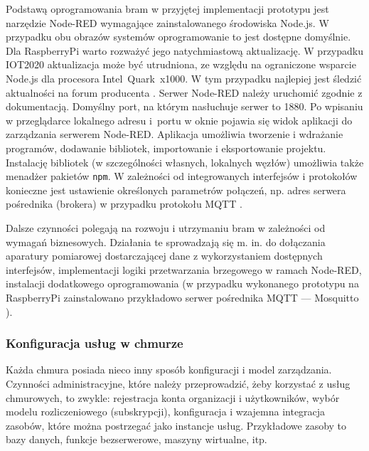 \documentclass[a4paper, 12pt, twoside]{article}
\begin{document}
Podstawą oprogramowania bram w przyjętej implementacji prototypu jest
narzędzie Node-RED wymagające zainstalowanego środowiska Node.js. W przypadku
obu obrazów systemów oprogramowanie to jest dostępne domyślnie. Dla RaspberryPi
warto rozważyć jego natychmiastową aktualizację. W przypadku IOT2020 aktualizacja
może być utrudniona, ze względu na ograniczone wsparcie Node.js dla procesora
Intel~Quark~x1000. W tym przypadku najlepiej jest śledzić aktualności na
forum producenta \cite{simatic-iot-forum}.
Serwer Node-RED należy uruchomić zgodnie z dokumentacją. Domyślny port, na
którym nasłuchuje serwer to 1880. Po wpisaniu w przeglądarce lokalnego adresu i~portu
w oknie pojawia się widok aplikacji do zarządzania serwerem Node-RED. Aplikacja
umożliwia tworzenie i wdrażanie programów, dodawanie bibliotek, importowanie i eksportowanie projektu.
Instalację bibliotek (w szczególności własnych, lokalnych węzłów) umożliwia także menadżer pakietów \texttt{npm}.
W zależności od integrowanych interfejsów i protokołów konieczne jest ustawienie
określonych parametrów połączeń, np. adres serwera pośrednika (brokera) w przypadku protokołu MQTT
\cite{node-red-doc}.

Dalsze czynności polegają na rozwoju i utrzymaniu bram w zależności od wymagań
biznesowych. Działania te sprowadzają się m. in. do dołączania aparatury pomiarowej dostarczającej dane
z wykorzystaniem dostępnych interfejsów, implementacji logiki przetwarzania
brzegowego w ramach Node-RED, instalacji dodatkowego oprogramowania
(w przypadku wykonanego prototypu na RaspberryPi zainstalowano przykładowo
serwer pośrednika MQTT --- Mosquitto \cite{mosquitto-doc}).


\subsubsection{Konfiguracja usług w chmurze}

Każda chmura posiada nieco inny sposób konfiguracji i model zarządzania.
Czynności administracyjne, które należy przeprowadzić, żeby korzystać z usług
chmurowych, to zwykle: rejestracja konta organizacji i użytkowników,
wybór modelu rozliczeniowego (subskrypcji), konfiguracja i wzajemna
integracja zasobów, które można postrzegać jako instancje usług. Przykładowe zasoby
to bazy danych, funkcje bezserwerowe, maszyny wirtualne, itp.
\end{document}
